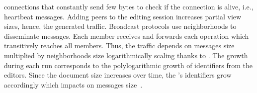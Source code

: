 \begin{asparadesc}
  connections that constantly send few bytes to check if the connection is
  alive, i.e., heartbeat messages. Adding peers to the editing session increases
  partial view sizes, hence, the generated traffic. Broadcast protocols use
  neighborhoods to disseminate messages. Each member receives and forwards each
  operation which transitively reaches all members. Thus, the traffic depends on
  messages size multiplied by neighborhoods size logarithmically scaling thanks
  to \SPRAY. The growth during each run corresponds to the polylogarithmic
  growth of identifiers from the editors. Since the document size increases over
  time, the \LSEQ's identifiers grow accordingly which impacts on messages
  size~\cite{nedelec2013lseq}.
\end{asparadesc}


